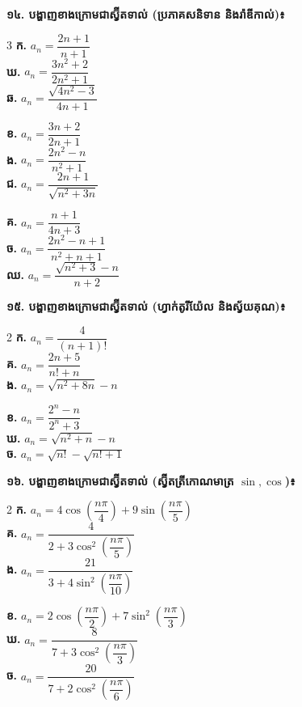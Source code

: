 \documentclass[11pt,a4paper]{article}
\begin{document}
\vspace{3pt}
\textbf{១៤. បង្ហាញខាងក្រោមជាស្វ៊ីតទាល់ (ប្រភាគសនិទាន និងរ៉ាឌីកាល់)៖}
\begin{multicols}{3}
\textbf{ក.} $a_n = \dfrac{2n+1}{n+1}$\\[9pt]
\textbf{ឃ.} $a_n = \dfrac{3n^2+2}{2n^2+1}$\\[9pt]
\textbf{ឆ.} $a_n = \dfrac{\sqrt{4n^2-3}}{4n+1}$

\columnbreak
\textbf{ខ.} $a_n = \dfrac{3n+2}{2n+1}$\\[9pt]
\textbf{ង.} $a_n = \dfrac{2n^2-n}{n^2+1}$\\[9pt]
\textbf{ជ.} $a_n = \dfrac{2n+1}{\sqrt{n^2+3n}}$

\columnbreak
\textbf{គ.} $a_n = \dfrac{n+1}{4n+3}$\\[9pt]
\textbf{ច.} $a_n = \dfrac{2n^2-n+1}{n^2+n+1}$\\[9pt]
\textbf{ឈ.} $a_n = \dfrac{\sqrt{n^2+3}-n}{n+2}$
\end{multicols}

\vspace{3pt}
\textbf{១៥. បង្ហាញខាងក្រោមជាស្វ៊ីតទាល់ (ហ្វាក់តូរីយ៉ែល និងស្វ័យគុណ)៖}
\begin{multicols}{2}
\textbf{ក.} $a_n = \dfrac{4}{(n+1)!}$\\[9pt]
\textbf{គ.} $a_n = \dfrac{2n+5}{n!+n}$\\[9pt]
\textbf{ង.} $a_n = \sqrt{n^2+8n}-n$

\columnbreak
\textbf{ខ.} $a_n = \dfrac{2^n-n}{2^n+3}$\\[9pt]
\textbf{ឃ.} $a_n = \sqrt{n^2+n}-n$\\[9pt]
\textbf{ច.} $a_n = \sqrt{n!}-\sqrt{n!+1}$
\end{multicols}

\vspace{3pt}
\textbf{១៦. បង្ហាញខាងក្រោមជាស្វ៊ីតទាល់ (ស្វ៊ីតត្រីកោណមាត្រ $\sin, \cos$)៖}
\begin{multicols}{2}
\textbf{ក.} $a_n = 4\cos\left(\dfrac{n\pi}{4}\right) + 9\sin\left(\dfrac{n\pi}{5}\right)$\\[9pt]
\textbf{គ.} $a_n = \dfrac{4}{2+3\cos^2\left(\dfrac{n\pi}{5}\right)}$\\[9pt]
\textbf{ង.} $a_n = \dfrac{21}{3+4\sin^2\left(\dfrac{n\pi}{10}\right)}$

\columnbreak
\textbf{ខ.} $a_n = 2\cos\left(\dfrac{n\pi}{2}\right) + 7\sin^2\left(\dfrac{n\pi}{3}\right)$\\[9pt]
\textbf{ឃ.} $a_n = \dfrac{8}{7+3\cos^2\left(\dfrac{n\pi}{3}\right)}$\\[9pt]
\textbf{ច.} $a_n = \dfrac{20}{7+2\cos^2\left(\dfrac{n\pi}{6}\right)}$
\end{multicols}
\end{document}
